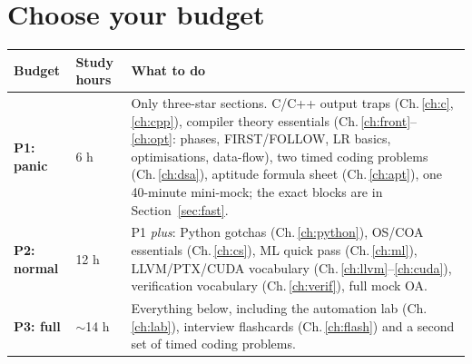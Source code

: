 \documentclass[10pt,a4paper,openany,oneside]{report}
\newcommand{\prio}[1]{\texorpdfstring{\ifcase#1\or{\color{gold}\ding{72}}\or{\color{gold}\ding{72}\ding{72}}\or{\color{gold}\ding{72}\ding{72}\ding{72}}\fi}{}}
\begin{document}
\section{Choose your budget \prio{3}}
\begin{center}
\small
\begin{xltabular}{\textwidth}{@{}L{2.5cm}L{2.2cm}Y@{}}
\toprule
\textbf{Budget} & \textbf{Study hours} & \textbf{What to do}\\
\midrule\endhead
\textbf{P1: panic} & 6 h & Only three-star sections. C/C++ output traps (Ch.\,\ref{ch:c}, \ref{ch:cpp}), compiler theory essentials (Ch.\,\ref{ch:front}--\ref{ch:opt}: phases, FIRST/FOLLOW, LR basics, optimisations, data-flow), two timed coding problems (Ch.\,\ref{ch:dsa}), aptitude formula sheet (Ch.\,\ref{ch:apt}), one 40-minute mini-mock; the exact blocks are in Section~\ref{sec:fast}.\\
\textbf{P2: normal} & 12 h & P1 \emph{plus}: Python gotchas (Ch.\,\ref{ch:python}), OS/COA essentials (Ch.\,\ref{ch:cs}), ML quick pass (Ch.\,\ref{ch:ml}), LLVM/PTX/CUDA vocabulary (Ch.\,\ref{ch:llvm}--\ref{ch:cuda}), verification vocabulary (Ch.\,\ref{ch:verif}), full mock OA.\\
\textbf{P3: full} & $\sim$14 h & Everything below, including the automation lab (Ch.\,\ref{ch:lab}), interview flashcards (Ch.\,\ref{ch:flash}) and a second set of timed coding problems.\\
\bottomrule
\end{xltabular}
\end{center}
\end{document}
